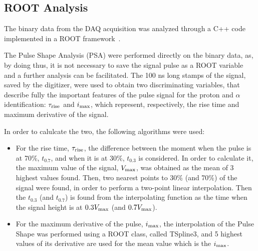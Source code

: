 \subsection{ROOT Analysis}

The binary data from the DAQ acquisition was analyzed through a C++ code
implemented in a ROOT framework~\cite{root}.

The Pulse Shape Analysis (PSA) were performed directly on the binary data, as,
by doing thus, it is not necessary to save the signal pulse as a ROOT variable
and a further analysis can be facilitated. The \num{100} ns long stamps of the
signal, saved by the digitizer, were used to obtain two discriminating
variables, that describe fully the important features of the pulse signal for
the proton and $\alpha$ identification: $\tau _{\textup{rise}}$ and
$i_{\textup{max}}$, which represent, respectively, the rise time and maximum
derivative of the signal.

In order to calulcate the two, the following algorithms were used:

\begin{itemize}

\item For the rise time, $\tau _{\textup{rise}}$, the difference between the moment when the pulse is at
  70\%, $t_{0.7}$, and when it is at 30\%, $t_{0.3}$ is considered.
  In order to calculate it, the maximum value of the signal, $V_{\textup{max}}$,
  was obtained as the mean of 3 highest values found. Then, two nearest points
  to 30\% (and 70\%) of the signal were found, in order to perform a two-point
  linear interpolation. Then the $t_{0.3}$ (and $t_{0.7}$) is found from the
  interpolating function as the time when the signal height is at
  $0.3 V_{\textup{max}}$
  (and $0.7 V_{\textup{max}}$).
\item For the maximum derivative of the pulse, $i_{\textup{max}}$, 
  the interpolation of the Pulse Shape was performed using a ROOT class,
  called TSpline3, and 5 highest values of its derivative are used for the
  mean value which is the $i_{\textup{max}}$.

\end{itemize}

